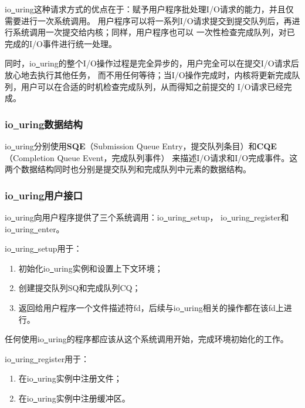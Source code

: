 \documentclass[supercite]{HustGraduPaper}
\theoremstyle{definition}
\begin{document}
io\underline{~}uring这种请求方式的优点在于：赋予用户程序批处理I/O请求的能力，并且仅需要进行一次系统调用。
用户程序可以将一系列I/O请求提交到提交队列后，再进行系统调用一次提交给内核；同样，用户程序也可以
一次性检查完成队列，对已完成的I/O事件进行统一处理。\par

同时，io\underline{~}uring的整个I/O操作过程是完全异步的，用户完全可以在提交I/O请求后放心地去执行其他任务，
而不用任何等待；当I/O操作完成时，内核将更新完成队列，用户可以在合适的时机检查完成队列，从而得知之前提交的
I/O请求已经完成。\par

\subsubsection{io\underline{~}uring数据结构}
io\underline{~}uring分别使用\textbf{SQE}（Submission Queue Entry，提交队列条目）和\textbf{CQE}（Completion Queue Event，完成队列事件）
来描述I/O请求和I/O完成事件。这两个数据结构同时也分别是提交队列和完成队列中元素的数据结构。\par

\subsubsection{io\underline{~}uring用户接口}

io\underline{~}uring向用户程序提供了三个系统调用：io\underline{~}uring\underline{~}setup，
io\underline{~}uring\underline{~}register和io\underline{~}uring\underline{~}enter。\par

io\underline{~}uring\underline{~}setup用于：

\begin{enumerate}[label={(\arabic*)}]
  \item 初始化io\underline{~}uring实例和设置上下文环境；
  \item 创建提交队列SQ和完成队列CQ；
  \item 返回给用户程序一个文件描述符fd，后续与io\underline{~}uring相关的操作都在该fd上进行。
\end{enumerate}

任何使用io\underline{~}uring的程序都应该从这个系统调用开始，完成环境初始化的工作。\par

io\underline{~}uring\underline{~}register用于：
\begin{enumerate}[label={(\arabic*)}]
  \item 在io\underline{~}uring实例中注册文件；
  \item 在io\underline{~}uring实例中注册缓冲区。
\end{enumerate}
\end{document}
